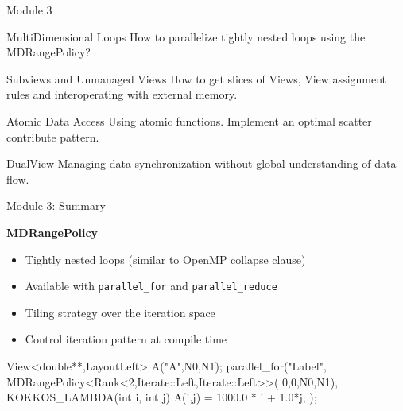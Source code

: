 \begin{frame}{Module 3}
  \begin{block}{MultiDimensional Loops}
    How to parallelize tightly nested loops using the MDRangePolicy?
  \end{block}

  \begin{block}{Subviews and Unmanaged Views}
    How to get slices of Views, View assignment rules and interoperating with external memory.
  \end{block}

  \begin{block}{Atomic Data Access}
    Using atomic functions. Implement an optimal scatter contribute pattern.
  \end{block}

  \begin{block}{DualView}
    Managing data synchronization without global understanding of data flow.
  \end{block}
\end{frame}







\begin{frame}[fragile]{Module 3: Summary}

	\textbf{MDRangePolicy}
        \begin{itemize}
                \item Tightly nested loops (similar to OpenMP collapse clause)
                \item Available with \texttt{parallel\_for} and \texttt{parallel\_reduce}
                \item Tiling strategy over the iteration space
                \item Control iteration pattern at compile time
        \end{itemize}

\begin{code}[keywords={double,Iterate,Left,Right,int,MDRangePolicy,Rank}]
View<double**,LayoutLeft> A("A",N0,N1);
parallel_for("Label",
  MDRangePolicy<Rank<2,Iterate::Left,Iterate::Left>>(
	{0,0},{N0,N1}),
  KOKKOS_LAMBDA(int i, int j) {
    A(i,j) = 1000.0 * i + 1.0*j;
});
\end{code}

\end{frame}

